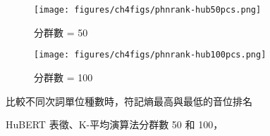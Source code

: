 
{
    \newcommand{\tempwidth}[0]{0.8\linewidth}
    \begin{figure}
         \centering
         \begin{subfigure}{\textwidth}
             \centering
             \texttt{[image: figures/ch4figs/phnrank-hub50pcs.png]}
             \caption{分群數 = 50}
             \label{fig:hub-u050-phnrank-hub50pcs}
         \end{subfigure}
         \vfill
         \begin{subfigure}{\textwidth}
             \centering
             \texttt{[image: figures/ch4figs/phnrank-hub100pcs.png]}
             \caption{分群數 = 100}
             \label{fig:hub-u050-phnrank-hub100pcs}
         \end{subfigure}

         \caption{HuBERT 表徵、K-平均演算法分群數 50 和 100，}
         比較不同次詞單位種數時，符記熵最高與最低的音位排名
                     \label{fig:hub-u050-phnrank}
    \end{figure}
}

